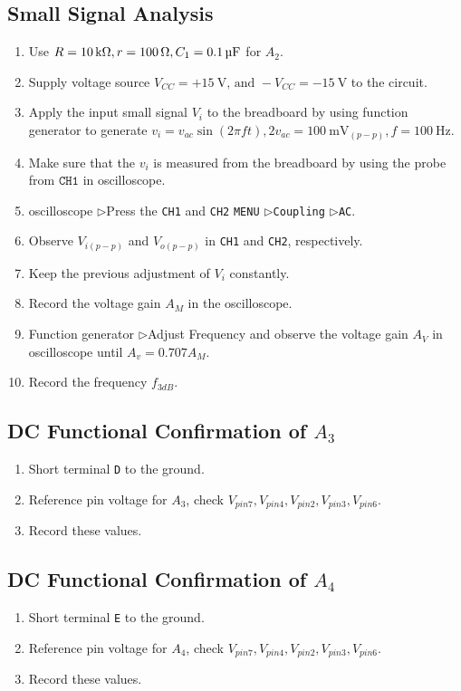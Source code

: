 \documentclass[12pt, a4paper]{article}
\newcommand{\tri}{$\rhd$}
\begin{document}
\subsection{Small Signal Analysis}
\begin{enumerate}[itemsep=0pt]
  \item Use $R = \SI{10}\kohm, r = \SI{100}\ohm, C_1 = \SI{0.1}\uF$ for $A_2$.
  \item Supply voltage source $V_{CC} = +\SI{15}\V \text{, and } -V_{CC} = \SI{-15}\V$ to the
    circuit.
  \item Apply the input small signal $V_i$ to the breadboard by using function generator
    to generate $v_i = v_{ac} \sin(2 \pi f t), 2 v_{ac} = \SI{100}\mV_{(p-p)}, f = \SI{100}\Hz$.
  \item Make sure that the $v_i$ is measured from the breadboard by using the probe from $\texttt{CH1}$
    in oscilloscope.
  \item oscilloscope \tri Press the \texttt{CH1} and \texttt{CH2} \texttt{MENU} \tri \texttt{Coupling}
    \tri \texttt{AC}.
  \item Observe $V_{i(p-p)}$ and $V_{o(p-p)}$ in \texttt{CH1} and \texttt{CH2}, respectively.
  \item Keep the previous adjustment of $V_i$ constantly.
  \item Record the voltage gain $A_M$ in the oscilloscope.
  \item Function generator \tri Adjust Frequency and observe the voltage gain $A_V$ in
    oscilloscope until $A_v = 0.707 A_M$.
  \item Record the frequency $f_{3dB}$.
\end{enumerate}

\subsection{DC Functional Confirmation of $A_3$}
\begin{enumerate}[itemsep=0pt]
  \item Short terminal \texttt{D} to the ground.
  \item Reference pin voltage for $A_3$, check $V_{pin7}, V_{pin4}, V_{pin2}, V_{pin3}, V_{pin6}$.
  \item Record these values.
\end{enumerate}

\subsection{DC Functional Confirmation of $A_4$}
\begin{enumerate}[itemsep=0pt]
  \item Short terminal \texttt{E} to the ground.
  \item Reference pin voltage for $A_4$, check $V_{pin7}, V_{pin4}, V_{pin2}, V_{pin3}, V_{pin6}$.
  \item Record these values.
\end{enumerate}
\end{document}
